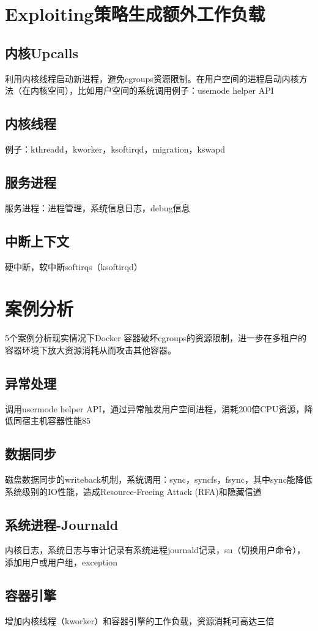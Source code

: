 \documentclass[UTF8]{ctexart}
\begin{document}
	\section{Exploiting策略生成额外工作负载}\label{sec:disnajie}
	\subsection{内核Upcalls}
	利用内核线程启动新进程，避免cgroups资源限制。在用户空间的进程启动内核方法（在内核空间），比如用户空间的系统调用例子：usemode helper API
	\subsection{内核线程}
	例子：kthreadd，kworker，ksoftirqd，migration，kswapd
	\subsection{服务进程}
	服务进程：进程管理，系统信息日志，debug信息
	\subsection{中断上下文}
	硬中断，软中断softirqs（ksoftirqd）
	\clearpage
	    
	\section{案例分析}\label{sec:diwujie}
	5个案例分析现实情况下Docker 容器破坏cgroups的资源限制，进一步在多租户的容器环境下放大资源消耗从而攻击其他容器。
	\subsection{异常处理}
	调用usermode helper API，通过异常触发用户空间进程，消耗200倍CPU资源，降低同宿主机容器性能85%
	\subsection{数据同步}
	磁盘数据同步的writeback机制，系统调用：sync，syncfs，fsync，其中sync能降低系统级别的IO性能，造成Resource-Freeing Attack (RFA)和隐藏信道
	\subsection{系统进程-Journald}
	内核日志，系统日志与审计记录有系统进程journald记录，su（切换用户命令），添加用户或用户组，exception
	\subsection{容器引擎}
	增加内核线程（kworker）和容器引擎的工作负载，资源消耗可高达三倍
\end{document}
